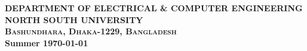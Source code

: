 \begin{titlepage}
\begin{center}
\textsc{ \bfseries{DEPARTMENT OF ELECTRICAL & COMPUTER ENGINEERING\\
NORTH SOUTH UNIVERSITY\\Bashundhara, Dhaka-1229, Bangladesh\\}}
{ \bfseries Summer {\thisyear\today}\\}
\vspace*{0.1cm}

\end{center}
\end{titlepage}


